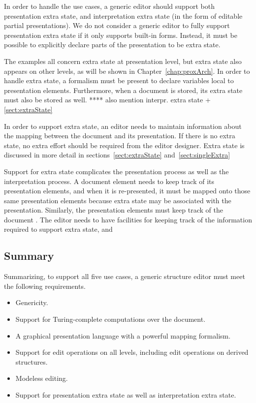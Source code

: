 In order to handle the use cases, a generic editor should support both presentation extra state, and interpretation extra state (in the form of editable partial presentations). We do not consider a generic editor to fully support presentation extra state if it only supports built-in forms. Instead, it must be possible to explicitly declare parts of the presentation to be extra state.

\bc
The examples all concern extra state at presentation level, but extra state also appears on other levels, as will be shown in Chapter~\ref{chap:proxArch}. In order to handle extra state, a formalism must be present to declare variables local to presentation elements. Furthermore, when a document is stored, its extra state must also be stored as well. **** also mention interpr. extra state + \ref{sect:extraState}
\ec

In order to support extra state, an editor needs to maintain information about the mapping between the document and its presentation. If there is no extra state, no extra effort should be required from the editor designer. Extra state is discussed in more detail in sections~\ref{sect:extraState} and~\ref{sect:singleExtra}

\bc
Support for extra state complicates the presentation process as well as the interpretation process. A document element needs to keep track of its presentation elements, and when it is re-presented, it must be mapped onto those same presentation elements because extra state may be associated with the presentation. Similarly, the presentation elements must keep track of the document . The editor needs to have facilities for keeping track of the information required to support extra state, and
\ec


%																
\subsection{Summary}

Summarizing, to support all five use cases, a generic structure editor must meet the following requirements.

\begin{itemize}
\item Genericity.
\item Support for Turing-complete computations over the document.
\item A graphical presentation language with a powerful mapping formalism.
\item Support for edit operations on all levels, including edit operations on derived structures.
\item Modeless editing.
\item Support for presentation extra state as well as interpretation extra state.
\end{itemize}

